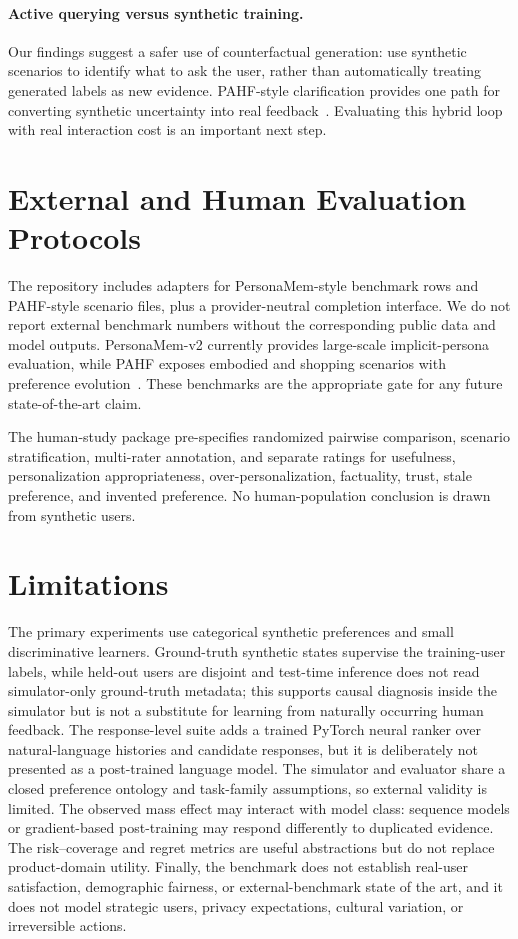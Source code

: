 \documentclass[10pt,twocolumn]{article}
\begin{document}
\paragraph{Active querying versus synthetic training.}
Our findings suggest a safer use of counterfactual generation: use synthetic scenarios to identify what to ask the user, rather than automatically treating generated labels as new evidence. PAHF-style clarification provides one path for converting synthetic uncertainty into real feedback~\cite{pahf}. Evaluating this hybrid loop with real interaction cost is an important next step.

\section{External and Human Evaluation Protocols}
The repository includes adapters for PersonaMem-style benchmark rows and PAHF-style scenario files, plus a provider-neutral completion interface. We do not report external benchmark numbers without the corresponding public data and model outputs. PersonaMem-v2 currently provides large-scale implicit-persona evaluation, while PAHF exposes embodied and shopping scenarios with preference evolution~\cite{personamemv2,pahf}. These benchmarks are the appropriate gate for any future state-of-the-art claim.

The human-study package pre-specifies randomized pairwise comparison, scenario stratification, multi-rater annotation, and separate ratings for usefulness, personalization appropriateness, over-personalization, factuality, trust, stale preference, and invented preference. No human-population conclusion is drawn from synthetic users.

\section{Limitations}
The primary experiments use categorical synthetic preferences and small discriminative learners. Ground-truth synthetic states supervise the training-user labels, while held-out users are disjoint and test-time inference does not read simulator-only ground-truth metadata; this supports causal diagnosis inside the simulator but is not a substitute for learning from naturally occurring human feedback. The response-level suite adds a trained PyTorch neural ranker over natural-language histories and candidate responses, but it is deliberately not presented as a post-trained language model. The simulator and evaluator share a closed preference ontology and task-family assumptions, so external validity is limited. The observed mass effect may interact with model class: sequence models or gradient-based post-training may respond differently to duplicated evidence. The risk--coverage and regret metrics are useful abstractions but do not replace product-domain utility. Finally, the benchmark does not establish real-user satisfaction, demographic fairness, or external-benchmark state of the art, and it does not model strategic users, privacy expectations, cultural variation, or irreversible actions.
\end{document}
